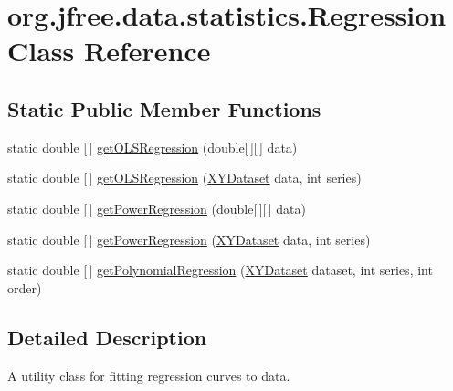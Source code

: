 \hypertarget{classorg_1_1jfree_1_1data_1_1statistics_1_1_regression}{}\section{org.\+jfree.\+data.\+statistics.\+Regression Class Reference}
\label{classorg_1_1jfree_1_1data_1_1statistics_1_1_regression}
\subsection*{Static Public Member Functions}
\begin{DoxyCompactItemize}
\item 
static double \mbox{[}$\,$\mbox{]} \mbox{\hyperlink{classorg_1_1jfree_1_1data_1_1statistics_1_1_regression_ab445a4f942aeaf348a74f4da1356b8fc}{get\+O\+L\+S\+Regression}} (double\mbox{[}$\,$\mbox{]}\mbox{[}$\,$\mbox{]} data)
\item 
static double \mbox{[}$\,$\mbox{]} \mbox{\hyperlink{classorg_1_1jfree_1_1data_1_1statistics_1_1_regression_a2d19e98caab60f2c7cd2fa43287a3caf}{get\+O\+L\+S\+Regression}} (\mbox{\hyperlink{interfaceorg_1_1jfree_1_1data_1_1xy_1_1_x_y_dataset}{X\+Y\+Dataset}} data, int series)
\item 
static double \mbox{[}$\,$\mbox{]} \mbox{\hyperlink{classorg_1_1jfree_1_1data_1_1statistics_1_1_regression_a14bca94af4ab4756b6f142bbf048603c}{get\+Power\+Regression}} (double\mbox{[}$\,$\mbox{]}\mbox{[}$\,$\mbox{]} data)
\item 
static double \mbox{[}$\,$\mbox{]} \mbox{\hyperlink{classorg_1_1jfree_1_1data_1_1statistics_1_1_regression_a1ce6a23a7227c4dfab01a37fa21dfff0}{get\+Power\+Regression}} (\mbox{\hyperlink{interfaceorg_1_1jfree_1_1data_1_1xy_1_1_x_y_dataset}{X\+Y\+Dataset}} data, int series)
\item 
static double \mbox{[}$\,$\mbox{]} \mbox{\hyperlink{classorg_1_1jfree_1_1data_1_1statistics_1_1_regression_a8dace72fbe5029ee28a88ab43640f655}{get\+Polynomial\+Regression}} (\mbox{\hyperlink{interfaceorg_1_1jfree_1_1data_1_1xy_1_1_x_y_dataset}{X\+Y\+Dataset}} dataset, int series, int order)
\end{DoxyCompactItemize}


\subsection{Detailed Description}
A utility class for fitting regression curves to data. 

